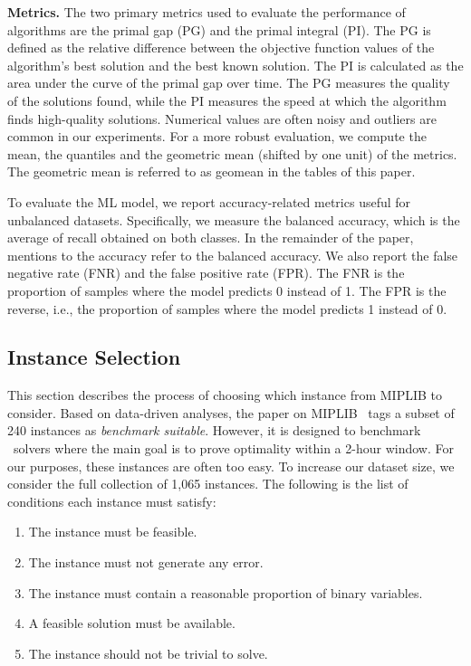 \documentclass[3p, authoryear, times]{elsarticle}
\begin{document}
\textbf{Metrics. }
The two primary metrics used to evaluate the performance of algorithms are the primal gap (PG) and the primal integral (PI). The PG is defined as the relative difference between the objective function values of the algorithm's best solution and the best known solution. The PI is calculated as the area under the curve of the primal gap over time. The PG measures the quality of the solutions found, while the PI measures the speed at which the algorithm finds high-quality solutions. Numerical values are often noisy and outliers are common in our experiments. For a more robust evaluation, we compute the mean, the quantiles and the geometric mean (shifted by one unit) of the metrics. The geometric mean is referred to as geomean in the tables of this paper. 

To evaluate the ML model, we report accuracy-related metrics useful for unbalanced datasets. Specifically, we measure the balanced accuracy, which is the average of recall obtained on both classes. In the remainder of the paper, mentions to the accuracy refer to the balanced accuracy. We also report the false negative rate (FNR) and the false positive rate (FPR). The FNR is the proportion of samples where the model predicts 0 instead of 1.  The FPR is the reverse, i.e., the proportion of samples where the model predicts 1 instead of 0.


\subsection{Instance Selection} \label{sec:lns:selection}
This section describes the process of choosing which instance from MIPLIB to consider.  Based on data-driven analyses, the paper on MIPLIB~\citep{gleixner_miplib_2021} tags a subset of 240 instances as \textit{benchmark suitable}. However, it is designed to benchmark \bnb\ solvers where the main goal is to prove optimality within a 2-hour window. For our purposes, these instances are often too easy. To increase our dataset size, we consider the full collection of 1,065 instances. The following is the list of conditions each instance must satisfy:

\begin{enumerate}
    \item The instance must be feasible. \label{item:feasible}
    \item The instance must not generate any error. \label{item:conditioned}
    \item The instance must contain a reasonable proportion of binary variables. \label{item:binary}
    \item A feasible solution must be available.  \label{item:solution}
    \item The instance should not be trivial to solve. \label{item:nontrivial}
\end{enumerate}
\end{document}
